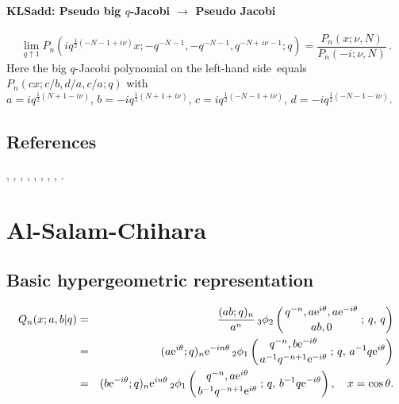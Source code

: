 \documentclass[envcountchap,graybox]{svmono}
\newcommand{\qhyp}[5]{\mbox{}_{#1}{\phi}_{#2}
\left(\genfrac{}{}{0pt}{}{#3}{#4}\,;\,q,\,#5\right)}
\newcommand{\e}{\textrm{e}}
\newcommand\half{\frac12}
\newcommand{\qhyp}[5]{\,\mbox{}_{#1}\phi_{#2}\!\left(
  \genfrac{}{}{0pt}{}{#3}{#4};#5\right)}
\newcommand\LHS{left-hand side}
\begin{document}
\paragraph{\large\bf KLSadd: Pseudo big $q$-Jacobi $\longrightarrow$ Pseudo Jacobi}\begin{equation}
\lim_{q\uparrow1}P_n(iq^{\half(-N-1+i\nu)}x;-q^{-N-1},-q^{-N-1},q^{-N+i\nu-1};q)
=\frac{P_n(x;\nu,N)}{P_n(-i;\nu,N)}\,.
\label{118}
\end{equation}
Here the big $q$-Jacobi polynomial on the \LHS\ equals
$P_n(cx;c/b,d/a,c/a;q)$ with\\
$a=iq^{\half(N+1-i\nu)}$, $b=-iq^{\half(N+1+i\nu)}$,
$c=iq^{\half(-N-1+i\nu)}$, $d=-iq^{\half(-N-1-i\nu)}$.
%

\subsection*{References}
\cite{AlvarezSmirnov}, \cite{AndrewsAskey85}, \cite{AskeyWilson79},
\cite{AskeyWilson85}, \cite{AtakRahmanSuslov}, \cite{GasperRahman90},
\cite{KoelinkKoorn}, \cite{Nikiforov+}, \cite{Stanton84}.


\section{Al-Salam-Chihara}
\par\setcounter{equation}{0}

\subsection*{Basic hypergeometric representation}
\begin{eqnarray}
\label{DefAlSalamChihara}
Q_n(x;a,b|q)&=&\frac{(ab;q)_n}{a^n}\,
\qhyp{3}{2}{q^{-n},a\e^{i\theta},a\e^{-i\theta}}{ab,0}{q}\\
&=&(a\e^{i\theta};q)_n\e^{-in\theta}\,\qhyp{2}{1}{q^{-n},b\e^{-i\theta}}
{a^{-1}q^{-n+1}\e^{-i\theta}}{a^{-1}q\e^{i\theta}}\nonumber\\
&=&(b\e^{-i\theta};q)_n\e^{in\theta}\,\qhyp{2}{1}{q^{-n},a\e^{i\theta}}
{b^{-1}q^{-n+1}\e^{i\theta}}{b^{-1}q\e^{-i\theta}},\quad x=\cos\theta.\nonumber
\end{eqnarray}
\end{document}
